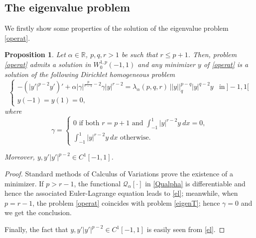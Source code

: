 \documentclass{amsart}
\newtheorem{prop}[thm]{Proposition}
\theoremstyle{definition}
\theoremstyle{remark}
\newcommand{\R}{\mathbb{R}}
\begin{document}
\subsection{The eigenvalue problem}
We firstly show some properties of the solution of the eigenvalue problem \eqref{operat}.
\begin{prop}
\label{propr}
Let $\alpha\in \R$, $p,q,r >1$ be such that $r \le p+1$. Then, problem \eqref{operat} admits a solution in $W_0^{1,p}(-1,1)$ and any minimizer $y$ of \eqref{operat} is a solution of the following Dirichlet homogeneous  problem
\begin{equation}
\label{el}
\left\{
\begin{array}{ll}
-(|y'|^{p-2}y')' + \alpha |\gamma|^{\frac p {r-1}-2}\gamma |y|^{r-2}=\lambda_\alpha(p,q,r)\, ||y||_q^{p-q}|y|^{q-2}y& \text{in}\ ]-1,1[\\[.4cm]
y(-1)=y(1)=0,
\end{array}
\right.
\end{equation}
where 
\[
\gamma=
\begin{cases}
0 \text{ if both } r=p+1 \text{ and }\displaystyle \int_{-1}^1 |y|^{r-2}y\  dx=0, \\
\displaystyle \int_{-1}^1 |y|^{r-2}y\  dx%
\text{ otherwise}.
\end{cases}
\]

Moreover, $y, y'|y'|^{p-2}\in C^1[-1,1]$.
\end{prop}
\begin{proof} 
Standard methods of Calculus of Variations prove the existence of a minimizer.
If $p>r-1$, the functional $\mathcal Q_\alpha[\cdot]$ in \eqref{Qualpha} is differentiable and hence the associated Euler-Lagrange equation leads to \eqref{el}; meanwhile, when $p=r-1$, the problem \eqref{operat} coincides with problem \eqref{eigenT}; hence $\gamma=0$ and we get the conclusion.

Finally, the fact that $y, y'|y'|^{p-2}\in C^1[-1,1]$ is easily seen from \eqref{el}. 
\end{proof}
\end{document}
